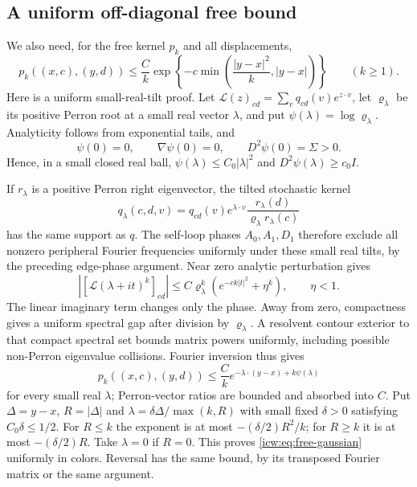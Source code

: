 \documentclass[11pt,letterpaper]{article}
\theoremstyle{remark}\newtheorem{remark}[theorem]{Remark}
\newcommand{\1}{\mathbf1}
\begin{document}
\subsection{A uniform off-diagonal free bound}
We also need, for the free kernel $p_k$ and all displacements,
\begin{equation}\label{icw:eq:free-gaussian}
 p_k((x,c),(y,d))\le\frac Ck
 \exp\left\{-c\min\left(\frac{|y-x|^2}k,|y-x|\right)\right\}
 \qquad(k\ge1).
\end{equation}
Here is a uniform small-real-tilt proof. Let
$\mathcal L(z)_{cd}=\sum_vq_{cd}(v)e^{z\cdot v}$, let
$\varrho_\lambda$ be its positive Perron root at a small real vector
$\lambda$, and put $\psi(\lambda)=\log\varrho_\lambda$.
Analyticity follows from exponential tails, and
\[
 \psi(0)=0,\qquad\nabla\psi(0)=0,\qquad D^2\psi(0)=\Sigma>0.
\]
Hence, in a small closed real ball,
$\psi(\lambda)\le C_0|\lambda|^2$ and
$D^2\psi(\lambda)\ge c_0I$.

If $r_\lambda$ is a positive Perron right eigenvector, the tilted
stochastic kernel
\[
 q_\lambda(c,d,v)=q_{cd}(v)e^{\lambda\cdot v}
                 \frac{r_\lambda(d)}{\varrho_\lambda r_\lambda(c)}
\]
has the same support as $q$. The self-loop phases $A_0,A_1,D_1$
therefore exclude all nonzero peripheral Fourier frequencies uniformly
under these small real tilts, by the preceding edge-phase argument.
Near zero analytic perturbation gives
\[
 |[\mathcal L(\lambda+it)^k]_{cd}|
 \le C\varrho_\lambda^k(e^{-ck|t|^2}+\eta^k),\qquad\eta<1.
\]
The linear imaginary term changes only the phase. Away from zero,
compactness gives a uniform spectral gap after division by
$\varrho_\lambda$. A resolvent contour exterior to that compact
spectral set bounds matrix powers uniformly, including possible
non-Perron eigenvalue collisions. Fourier inversion thus gives
\[
 p_k((x,c),(y,d))\le\frac Ck
 e^{-\lambda\cdot(y-x)+k\psi(\lambda)}
\]
for every small real $\lambda$; Perron-vector ratios are bounded and
absorbed into $C$. Put $\Delta=y-x$, $R=|\Delta|$ and
$\lambda=\delta\Delta/\max(k,R)$ with small fixed $\delta>0$
satisfying $C_0\delta\le1/2$. For $R\le k$ the exponent is at most
$-(\delta/2)R^2/k$; for $R\ge k$ it is at most $-(\delta/2)R$.
Take $\lambda=0$ if $R=0$. This proves \eqref{icw:eq:free-gaussian}
uniformly in colors. Reversal has the same bound, by its transposed
Fourier matrix or the same argument.
\end{document}
